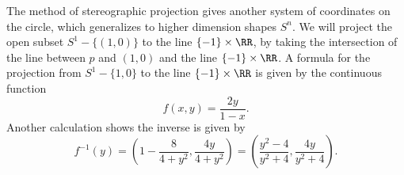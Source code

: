\begin{example}

    The method of stereographic projection gives another system of coordinates on the circle, which generalizes to higher dimension shapes $S^n$. We will project the open subset $S^1 - \{ (1,0) \}$ to the line $\{ -1 \} \times \RR$, by taking the intersection of the line between $p$ and $(1,0)$ and the line $\{ -1 \} \times \RR$. A formula for the projection from $S^1 - \{ 1, 0 \}$ to the line $\{ -1 \} \times \RR$ is given by the continuous function
    \[ f(x,y) = \frac{2y}{1-x}. \]
    Another calculation shows the inverse is given by
    \[ f^{-1}(y) = \left(1 - \frac{8}{4 + y^2} , \frac{4y}{4 + y^2} \right) = \left( \frac{y^2 - 4}{y^2 + 4}, \frac{4y}{y^2 + 4} \right). \]

\end{example}
